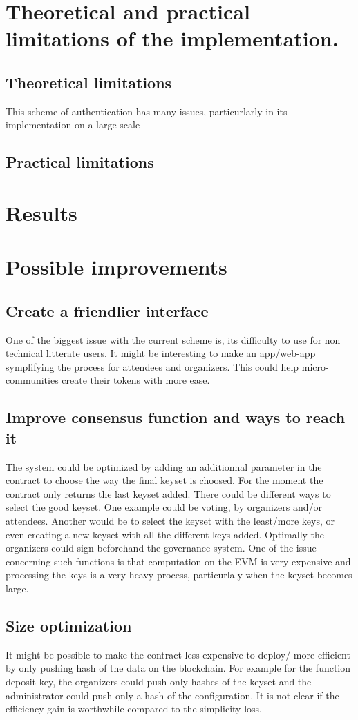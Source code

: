\documentclass[11pt, a4paper, twoside, openright]{book} %
\begin{document}
\section{Theoretical and practical limitations of the implementation.}
\subsection{Theoretical limitations}
This scheme of authentication has many issues, particurlarly in its implementation on a large scale
\subsection{Practical limitations}
\section{Results}
\section{Possible improvements}

\subsection{Create a friendlier interface}
One of the biggest issue with the current scheme is, its difficulty to use for non technical litterate users. It might be interesting to make an app/web-app symplifying the process for attendees and organizers. This could help micro-communities create their tokens with more ease.
\subsection{Improve consensus function and ways to reach it}
The system could be optimized by adding an additionnal parameter in the contract to choose the way the final keyset is choosed. For the moment the contract only returns the last keyset added. There could be different ways to select the good keyset. One example could be voting, by organizers and/or attendees. Another would be to select the keyset with the least/more keys, or even creating a new keyset with all the different keys added. Optimally the organizers could sign beforehand the governance system. One of the issue concerning such functions is that computation on the EVM is very expensive and processing the keys is a very heavy process, particurlaly when the keyset becomes large. 

\subsection{Size optimization}
It might be possible to make the contract less expensive to deploy/ more efficient by only pushing hash of the data on the blockchain. For example for the function deposit key, the organizers could push only hashes of the keyset and the administrator could push only a hash of the configuration. It is not clear if the efficiency gain is worthwhile compared to the simplicity loss.
\end{document}
